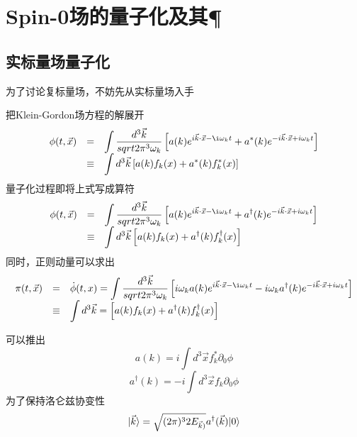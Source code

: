 
\section{Spin-0场的量子化及其\C \P \T}
\subsection{实标量场量子化}
为了讨论复标量场，不妨先从实标量场入手

把Klein-Gordon场方程的解展开
\begin{equation}
    \begin{array}{lll}
        \phi(t, \vec x) &=&\displaystyle \int \VolumeUnit k \omega \left[ a(k) e^{i\vec k \cdot \vec x - \i\omega_k t} + a^*(k)e^{-i\vec k \cdot \vec x + i \omega_k t} \right] \\
        &\equiv& \displaystyle\int d^3\vec k \left[a(k)f_k(x) + a^*(k)f_k^*(x)\right]
    \end{array}
\end{equation}
量子化过程即将上式写成算符
\begin{equation}
    \begin{array}{lll}
        \phi(t, \vec x) &=& \displaystyle\int \VolumeUnit k \omega \left[ a(k) e^{i\vec k \cdot \vec x - \i\omega_k t} + a^\dagger(k)e^{-i\vec k \cdot \vec x + i \omega_k t} \right] \\
        &\equiv& \displaystyle\int d^3\vec k \left[a(k)f_k(x) + a^\dagger(k)f_k^\dagger(x)\right]
    \end{array}
\end{equation}
同时，正则动量可以求出
\begin{equation}
    \begin{array}{lll}
        \pi(t, \vec x) &=& \dot \phi(t, x) = \displaystyle\int \VolumeUnit k \omega \left[ i\omega_k a(k) e^{i\vec k \cdot \vec x - \i\omega_k t} - i\omega_k a^\dagger(k)e^{-i\vec k \cdot \vec x + i \omega_k t} \right] \\
        &\equiv& \displaystyle\int d^3\vec k = \left[a(k)f_k(x) + a^\dagger(k)f_k^\dagger(x)\right]
    \end{array}
    \end{equation}

    可以推出
    \begin{equation}
        a(k) = i \int d^3 \vec x f_k^*\partial_0\phi
    \end{equation}
    \begin{equation}
        a^\dagger(k) = -i \int d^3 \vec x f_k\partial_0\phi
    \end{equation}
    为了保持洛仑兹协变性
    \begin{equation}
    |\vec k\rangle = \sqrt{(2\pi)^32E_{\vec k)}} a^\dagger(\vec k)|0\rangle
\end{equation}

